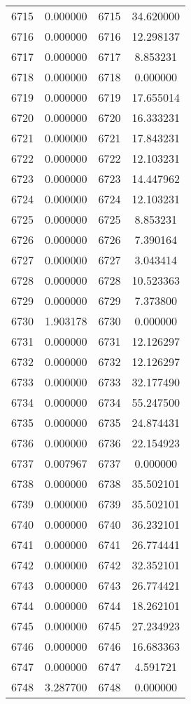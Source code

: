 \documentclass[12pt]{article}
\begin{document}
\begin{longtable}{@{}cccc@{}}
6715 & 0.000000 & 6715 & 34.620000 \\
6716 & 0.000000 & 6716 & 12.298137 \\
6717 & 0.000000 & 6717 & 8.853231 \\
6718 & 0.000000 & 6718 & 0.000000 \\
6719 & 0.000000 & 6719 & 17.655014 \\
6720 & 0.000000 & 6720 & 16.333231 \\
6721 & 0.000000 & 6721 & 17.843231 \\
6722 & 0.000000 & 6722 & 12.103231 \\
6723 & 0.000000 & 6723 & 14.447962 \\
6724 & 0.000000 & 6724 & 12.103231 \\
6725 & 0.000000 & 6725 & 8.853231 \\
6726 & 0.000000 & 6726 & 7.390164 \\
6727 & 0.000000 & 6727 & 3.043414 \\
6728 & 0.000000 & 6728 & 10.523363 \\
6729 & 0.000000 & 6729 & 7.373800 \\
6730 & 1.903178 & 6730 & 0.000000 \\
6731 & 0.000000 & 6731 & 12.126297 \\
6732 & 0.000000 & 6732 & 12.126297 \\
6733 & 0.000000 & 6733 & 32.177490 \\
6734 & 0.000000 & 6734 & 55.247500 \\
6735 & 0.000000 & 6735 & 24.874431 \\
6736 & 0.000000 & 6736 & 22.154923 \\
6737 & 0.007967 & 6737 & 0.000000 \\
6738 & 0.000000 & 6738 & 35.502101 \\
6739 & 0.000000 & 6739 & 35.502101 \\
6740 & 0.000000 & 6740 & 36.232101 \\
6741 & 0.000000 & 6741 & 26.774441 \\
6742 & 0.000000 & 6742 & 32.352101 \\
6743 & 0.000000 & 6743 & 26.774421 \\
6744 & 0.000000 & 6744 & 18.262101 \\
6745 & 0.000000 & 6745 & 27.234923 \\
6746 & 0.000000 & 6746 & 16.683363 \\
6747 & 0.000000 & 6747 & 4.591721 \\
6748 & 3.287700 & 6748 & 0.000000 \\

\end{longtable}
\end{document}

